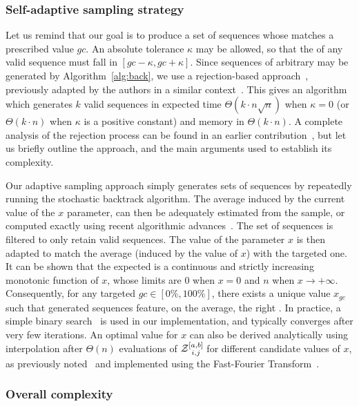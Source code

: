 \subsubsection{Self-adaptive sampling strategy}

Let us remind that our goal is to produce a set of sequences whose \GCContent matches a prescribed value $gc$.
An absolute tolerance $\kappa$ may be allowed, so that the \GCContent of any valid sequence must fall in  
$[gc-\kappa,gc+\kappa]$. Since sequences of arbitrary \GCContent may be generated by Algorithm~\ref{alg:back}, we use a rejection-based approach~\cite{Bodini2010}, previously adapted by the authors in a similar context~\cite{Waldispuhl2011}. This gives an algorithm which generates $k$ valid sequences in expected time $\Theta(k\cdot n\sqrt{n})$ when $\kappa=0$ (or $\Theta(k\cdot n)$ when $\kappa$ is a positive constant) and memory in $\Theta(k\cdot n)$.
A complete analysis of the rejection process can be found in an earlier contribution~\cite{Waldispuhl2011}, but let us briefly outline the approach, and the main arguments used to establish its complexity.

Our adaptive sampling approach simply generates sets of sequences by repeatedly running the stochastic backtrack algorithm. The average \GCContent induced by the current value of the $x$ parameter, can then be adequately estimated from the sample, or computed exactly using recent algorithmic advances~\cite{Ponty2011}. The set of sequences is filtered to only retain valid sequences. The value of the parameter $x$ is then adapted to match the average \GCContent (induced by the value of $x$) with the targeted one.
It can be shown that the expected \GCContent is a continuous and strictly increasing monotonic function of $x$, whose limits are $0$ when $x=0$ and $n$ when $x\to +\infty$. Consequently, for any targeted \GCContent $gc\in[0\%,100\%]$, there exists a unique value $x_{gc}$ such that generated sequences feature, on the average, the right \GCContent.
In practice, a simple binary search~\cite{Waldispuhl2011} is used in our implementation, and typically converges after very few iterations. An optimal value for $x$ can also be derived analytically using interpolation after $\Theta(n)$ evaluations of $\Z{i,j}{a,b}$ for different candidate values of $x$, as previously noted~\cite{Waldispuhl2011} and implemented using the Fast-Fourier Transform~\cite{Senter2012}.

\subsubsection{Overall complexity}

